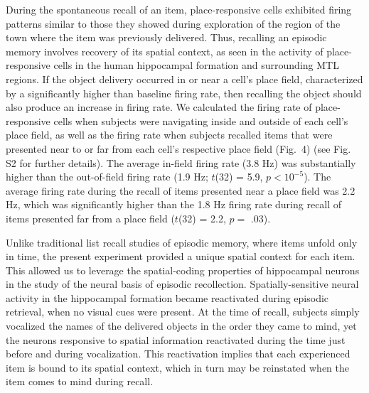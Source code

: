 During the spontaneous recall of an item, place-responsive cells exhibited firing patterns similar to those they showed during exploration of the region of the town where the item was previously delivered.  Thus, recalling an episodic memory involves recovery of its spatial context, as seen in the activity of place-responsive cells in the human hippocampal formation and surrounding MTL regions. If the object delivery occurred in or near a cell's place field, characterized by a significantly higher than baseline firing rate, then recalling the object should also produce an increase in firing rate. We calculated the firing rate of place-responsive cells when subjects were navigating inside and outside of each cell's place field, as well as the firing rate when subjects recalled items that were presented near to or far from each cell's respective place field (Fig.~4) (see Fig. S2 for further details).  The average in-field firing rate (3.8 Hz) was substantially higher than the out-of-field firing rate  (1.9 Hz; $t$(32) = 5.9, $p < 10^{-5}$).  The average firing rate during the recall of items presented near a place field was 2.2 Hz, which was significantly higher than the 1.8 Hz firing rate during recall of items presented far from a place field ($t$(32) = 2.2, $p =$ .03).


Unlike traditional list recall studies of episodic memory, where items unfold only in time, the present experiment provided a unique spatial context for each item.  This allowed us to leverage the  spatial-coding properties of hippocampal neurons in the study of the neural basis of episodic recollection.  Spatially-sensitive neural activity in the hippocampal formation became reactivated during episodic retrieval, when no visual cues were present.  At the time of recall, subjects simply vocalized the names of the delivered objects in the order they came to mind, yet the neurons responsive to spatial  information reactivated during the time just before and during vocalization.  This reactivation implies  that  each experienced item is bound to its spatial context, which in turn may be reinstated when the item comes to mind during recall.  

